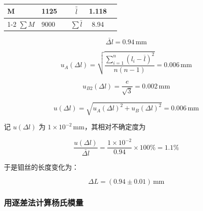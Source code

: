 \documentclass[zihao=5, UTF8]{article}
\theoremstyle{MyLineTheoremStyle} %
\theoremstyle{MyBlockTheoremStyle} %
\theoremstyle{MySubsubsectionStyle} %
\begin{document}
\begin{table}[H]
\begin{tabular}{|l|l|llc|lll|}
		M                                          & 1125                                                                                      & \multicolumn{1}{c|}{\multirow{2}{*}{}}                                  & \multicolumn{1}{c|}{$\bar{\bar{l}}$}                                                  & 1.118                                                              & \multicolumn{3}{c|}{\multirow{2}{*}{}}                                                                                                                                                                                                                                               \\ \cline{1-2} \cline{4-5}
		$\sum M$                                         & 9000                                                                                     & \multicolumn{1}{c|}{}                                                   & \multicolumn{1}{c|}{$\sum \bar{l}$}                                                 & 8.94                                                                    & \multicolumn{3}{c|}{}                                                                                                                                                                                                                                                                \\ \hline
	\end{tabular}
\end{table}

\[ \bar{\Delta l} = 0.94 \, \text{mm} \]

\[ u_A(\Delta l) = \sqrt{\frac{\sum_{i=1}^{n} (l_i - \overline{l})^2}{n(n-1)}} = 0.006 \, \text{mm} \]

\[ u_{B2}(\Delta l) = \frac{e}{\sqrt{3}} = 0.002 \, \text{mm} \]

\[ u(\Delta l) = \sqrt{u_A(\Delta l)^2 + u_B(\Delta l)^2} = 0.006 \, \text{mm} \]

记 $u(\Delta l)$ 为 $1 \times 10^{-2} \, \text{mm}$，其相对不确定度为

\[ \frac{u(\Delta l)}{\bar{\Delta l}} = \frac{1 \times 10^{-2}}{0.94} \times 100 \% = 1.1 \% \]

于是钼丝的长度变化为：

\[ \Delta L = (0.94 \pm 0.01) \, \text{mm} \]

\subsubsection{用逐差法计算杨氏模量}
\end{document}
